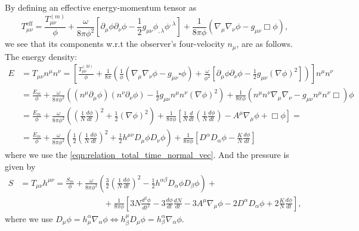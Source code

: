 By defining an effective energy-momentum tensor as
\begin{equation}
    T^{\mathrm{eff}}_{\mu\nu}=\frac{T_{\mu\nu}^{(m)}}{\phi}+\frac{\omega}{8\pi\phi^2}\left[\partial_\mu \phi \partial_\nu \phi-\frac{1}{2}g_{\mu\nu}\phi_{,\lambda}\phi^{,\lambda}\right]+\frac{1}{8\pi\phi}\left(\nabla_\mu\nabla_\nu\phi-g_{\mu\nu}\Box\phi\right),
\end{equation}
we see that its components w.r.t the observer's four-velocity $n_\mu$, are as follows. The energy density:
\begin{align}
    E &= T_{\mu\nu}n^\mu n^\nu=\left[\frac{T^{(M)}_{\mu \nu}}{\phi}+\frac{1}{8\pi}\left(\frac{1}{\phi}\left(\nabla_\mu \nabla_\nu \phi-g_{\mu \nu} \square \phi\right)+\frac{\omega}{\phi^2}\left[\partial_\mu \phi \partial_\nu \phi-\frac{1}{2} g_{\mu \nu}(\nabla \phi)^2\right]\right)\right]n^\mu n^\nu\nonumber\\
    &=\frac{E_m}{\phi}+\frac{\omega}{8\pi\phi^2}\left((n^\mu\partial_\mu \phi)(n^\nu\partial_\nu\phi)-\frac{1}{2}g_{\mu\nu}n^\mu n^\nu (\nabla \phi)^2\right)+\frac{1}{8\pi\phi}\left(n^\mu n^\nu \nabla_\mu \nabla_\nu - g_{\mu\nu}n^\mu n^\nu \Box\right)\phi\nonumber\\
    &=\frac{E_m}{\phi}+\frac{\omega}{8\pi\phi^2}\left(\left(\frac{1}{N}\frac{d\phi}{dt}\right)^2+\frac{1}{2}(\nabla\phi)^2\right)+\frac{1}{8\pi\phi}\left[\frac{1}{N}\frac{d}{dt}\left(\frac{1}{N}\frac{d\phi}{dt}\right)-A^\mu\nabla_\mu\phi+\Box\phi\right]=\nonumber\\
    &=\frac{E_m}{\phi}+\frac{\omega}{8\pi\phi^2}\left(\frac{1}{2}\left(\frac{1}{N}\frac{d\phi}{dt}\right)^2+\frac{1}{2}h^{\mu\nu}D_\mu\phi D_\nu\phi\right)+\frac{1}{8\pi\phi}\left[D^\alpha D_\alpha\phi-\frac{K}{N}\frac{d\phi}{dt}\right]
    \label{eqn:energy_density_jf}
\end{align}
where we use the \cref{eqn:relation_total_time_normal_vec}. And the pressure is given by
\begin{align}
    S&=T_{\mu\nu}h^{\mu\nu}=\frac{S_m}{\phi}+\frac{\omega}{8\pi \phi^2}\left(\frac{3}{2}\left(\frac{1}{N}\frac{d\phi}{dt}\right)^2 -\frac{1}{2}h^{\alpha\beta} D_\alpha\phi D_\beta\phi\right)+\label{eqn:pressure_jf}\\
    &\qquad\qquad\qquad\qquad\qquad+\frac{1}{8\pi \phi}\left[3N\frac{d^2\phi}{dt^2}-3\frac{d\phi}{dt}\frac{dN}{dt}-3A^\mu\nabla_\mu\phi -2D^\alpha D_\alpha \phi+2\frac{K}{N}\frac{d\phi}{dt} \right],\nonumber
\end{align}
where we use $D_\mu \phi = h_\mu^\alpha \nabla_\alpha\phi \Leftrightarrow h^\mu_\beta D_\mu \phi = h^\alpha_\beta \nabla_\alpha \phi$.




